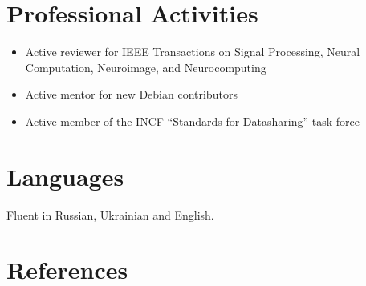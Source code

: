 \documentclass[12pt,overlapped,line]{res}
\begin{document}
\begin{resume}
\section{Professional Activities}
\begin{itemize}
\item Active reviewer for IEEE Transactions on Signal Processing,
  Neural Computation, Neuroimage, and Neurocomputing
\item Active mentor for new Debian contributors
\item Active member of the INCF ``Standards for Datasharing'' task force
\end{itemize}


\section{Languages}
 Fluent in Russian, Ukrainian and English.

 \section{References}


\end{resume}
\end{document}
